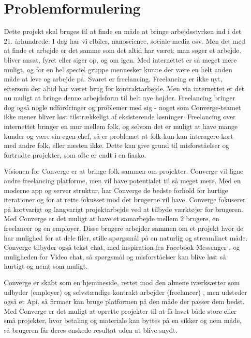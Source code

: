 \section{Problemformulering}

Dette projekt skal bruges til at finde en måde at bringe arbejdsstyrken ind i det 21. århundrede. I dag har vi elbiler, nanoscience, sociale-media osv. Men det med at finde et arbejde er det samme som det altid har været; man søger et arbejde, bliver ansat, fyret eller siger op, og om igen. Med internettet er så meget mere muligt, og for en hel speciel gruppe mennesker kunne der være en helt anden måde at leve og arbejde på. Svaret er freelancing. Freelancing er ikke nyt, eftersom der altid har været brug for kontraktarbejde. Men via internettet er det nu muligt at bringe denne arbejdsform til helt nye højder. Freelancing bringer dog også nogle udfordringer og problemer med sig - noget som Converge-teamet ikke mener bliver løst tilstrækkeligt af eksisterende løsninger. Freelancing over internettet bringer en mur mellem folk, og selvom det er muligt at have mange kunder og være sin egen chef, så er problemet at folk kun kan interagere kort med andre folk, eller næsten ikke. Dette kan give grund til misforståelser og fortrudte projekter, som ofte er endt i en fiasko.

Visionen for Converge er at bringe folk sammen om projekter. Converge vil ligne andre freelancing platforme, men vil have potentialet til så meget mere. Med en moderne app og server struktur, har Converge de bedste forhold for hurtige iterationer og for at rette fokusset mod det brugerne vil have. Converge fokuserer på kortvarigt og langvarigt projektarbejde ved at tilbyde værktøjer for brugeren. Med Converge er det muligt at have et samarbejde mellem 2 brugere, en freelancer og en employer. Disse brugere arbejder sammen om et projekt hvor de har mulighed for at dele filer, stille spørgsmål på en naturlig og streamlinet måde. Converge tilbyder også tekst chat, med inspiration fra Facebook Messenger \cite{Facebook}, og muligheden for Video chat, så spørgsmål og misforståelser kan blive løst så hurtigt og nemt som muligt.

Converge er skabt som en hjemmeside, rettet mod den almene iværksætter som udbyder (employer) \cite[Employer]{converge-terms} og selvstændige kontrakt arbejder (freelancer) \cite[Freelancer]{converge-terms} , men udsteder også et Api, så firmaer kan bruge platformen på den måde der passer dem bedst. Med Converge er det muligt at oprette projekter til at få lavet både store eller små projekter, hvor betaling og materiale kan byttes på en sikker og nem måde, så brugeren får deres ønskede resultat uden at blive snydt.

